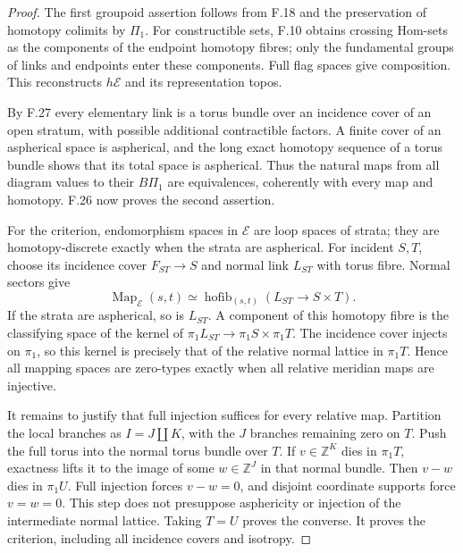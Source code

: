 \begin{proof}
The first groupoid assertion follows from F.18 and the preservation
of homotopy colimits by $\Pi_1$. For constructible sets, F.10 obtains
crossing Hom-sets as the components of the endpoint homotopy fibres;
only the fundamental groups of links and endpoints enter these
components. Full flag spaces give composition. This reconstructs
$h\mathcal E$ and its representation topos.

By F.27 every elementary link is a torus bundle over an incidence
cover of an open stratum, with possible additional contractible
factors. A finite cover of an aspherical space is aspherical, and
the long exact homotopy sequence of a torus bundle shows that its
total space is aspherical. Thus the natural maps from all diagram
values to their $B\Pi_1$ are equivalences, coherently with every
map and homotopy. F.26 now proves the second assertion.

For the criterion, endomorphism spaces in $\mathcal E$ are loop
spaces of strata; they are homotopy-discrete exactly when the strata
are aspherical. For incident $S,T$, choose its incidence cover
$F_{ST}\to S$ and normal link $L_{ST}$ with torus fibre. Normal
sectors give
\[
 \operatorname{Map}_{\mathcal E}(s,t)
 \simeq\operatorname{hofib}_{(s,t)}(L_{ST}\to S\times T).
\]
If the strata are aspherical, so is $L_{ST}$. A component of this
homotopy fibre is the classifying space of the kernel of
$\pi_1L_{ST}\to\pi_1S\times\pi_1T$. The incidence cover injects
on $\pi_1$, so this kernel is precisely that of the relative normal
lattice in $\pi_1T$. Hence all mapping spaces are zero-types exactly
when all relative meridian maps are injective.

It remains to justify that full injection suffices for every relative
map. Partition the local branches as $I=J\amalg K$, with the $J$
branches remaining zero on $T$. Push the full torus into the normal
torus bundle over $T$. If $v\in\mathbb Z^K$ dies in $\pi_1T$,
exactness lifts it to the image of some $w\in\mathbb Z^J$ in that
normal bundle. Then $v-w$ dies in $\pi_1U$. Full injection forces
$v-w=0$, and disjoint coordinate supports force $v=w=0$. This step
does not presuppose asphericity or injection of the intermediate
normal lattice. Taking $T=U$ proves the converse. It proves the
criterion, including all incidence covers and isotropy.
\end{proof}

